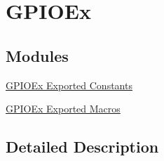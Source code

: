\hypertarget{group___g_p_i_o_ex}{}\section{G\+P\+I\+O\+Ex}
\label{group___g_p_i_o_ex}
\subsection*{Modules}
\begin{DoxyCompactItemize}
\item 
\hyperlink{group___g_p_i_o_ex___exported___constants}{G\+P\+I\+O\+Ex Exported Constants}
\item 
\hyperlink{group___g_p_i_o_ex___exported___macros}{G\+P\+I\+O\+Ex Exported Macros}
\end{DoxyCompactItemize}


\subsection{Detailed Description}
